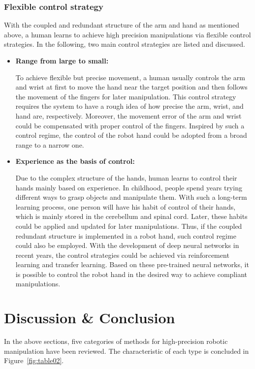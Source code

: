 \documentclass[journal,twoside,web]{ieeecolor}
\begin{document}
\subsubsection{Flexible control strategy} 
With the coupled and redundant structure of the arm and hand as mentioned above, a human learns to achieve high precision manipulations via flexible control strategies. In the following, two main control strategies are listed and discussed.
\begin{itemize}
    \item \textbf{Range from large to small:}
    
    To achieve flexible but precise movement, a human usually controls the arm and wrist at first to move the hand near the target position and then follows the movement of the fingers for later manipulation. This control strategy requires the system to have a rough idea of how precise the arm, wrist, and hand are, respectively. Moreover, the movement error of the arm and wrist could be compensated with proper control of the fingers. Inspired by such a control regime, the control of the robot hand could be adopted from a broad range to a narrow one.
    
    \item \textbf{Experience as the basis of control:}
    
    Due to the complex structure of the hands, human learns to control their hands mainly based on experience. In childhood, people spend years trying different ways to grasp objects and manipulate them. With such a long-term learning process, one person will have his habit of control of their hands, which is mainly stored in the cerebellum and spinal cord. Later, these habits could be applied and updated for later manipulations. Thus, if the coupled redundant structure is implemented in a robot hand, such control regime could also be employed. With the development of deep neural networks in recent years, the control strategies could be achieved via reinforcement learning and transfer learning. Based on these pre-trained neural networks, it is possible to control the robot hand in the desired way to achieve compliant manipulations.	
\end{itemize}

\section{Discussion \& Conclusion}
\label{sec:discuss}

In the above sections, five categories of methods for high-precision robotic manipulation have been reviewed. 
The characteristic of each type is concluded in Figure~\ref{fig:table02}.
\end{document}
